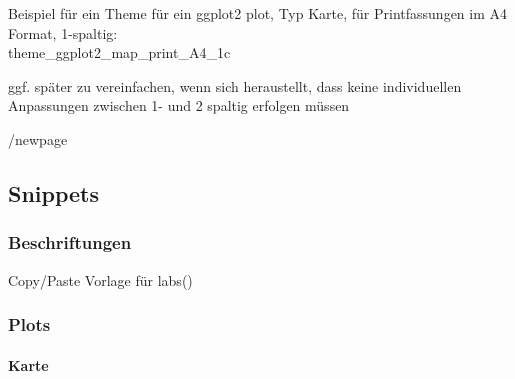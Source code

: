 \documentclass[
]{article}
\let\oldparagraph\paragraph
\renewcommand{\paragraph}[1]{\oldparagraph{#1}\mbox{}}
\begin{document}
Beispiel für ein Theme für ein ggplot2 plot, Typ Karte, für
Printfassungen im A4 Format, 1-spaltig:\\
theme\_ggplot2\_map\_print\_A4\_1c

ggf. später zu vereinfachen, wenn sich heraustellt, dass keine
individuellen Anpassungen zwischen 1- und 2 spaltig erfolgen müssen

/newpage

\hypertarget{snippets}{%
\subsection{Snippets}\label{snippets}}

\hypertarget{beschriftungen}{%
\subsubsection{Beschriftungen}\label{beschriftungen}}

Copy/Paste Vorlage für labs()

\newpage

\hypertarget{plots}{%
\subsubsection{Plots}\label{plots}}

\hypertarget{karte}{%
\paragraph{Karte}\label{karte}}
\end{document}
